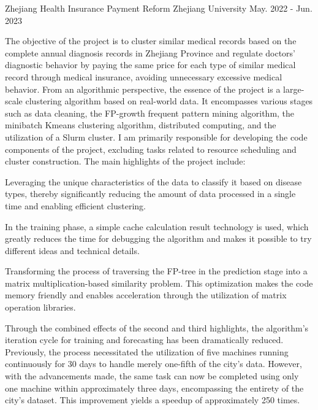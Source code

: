 
\begin{cventries}
	\cventry
	{} %
	{Zhejiang Health Insurance Payment Reform} %
	{Zhejiang University} %
	{May. 2022 - Jun. 2023} %
	{
		\quad The objective of the project is to cluster similar medical records based on the complete annual diagnosis records in Zhejiang Province and regulate doctors' diagnostic behavior by paying the same price for each type of similar medical record through medical insurance, avoiding unnecessary excessive medical behavior. \newline
		\quad From an algorithmic perspective, the essence of the project is a large-scale clustering algorithm based on real-world data. It encompasses various stages such as data cleaning, the FP-growth frequent pattern mining algorithm, the minibatch Kmeans clustering algorithm, distributed computing, and the utilization of a Slurm cluster. I am primarily responsible for developing the code components of the project, excluding tasks related to resource scheduling and cluster construction. \newline
		The main highlights of the project include: \newline
		\vspace{3.5mm}
		\begin{cvitems} %
			\item{Leveraging the unique characteristics of the data to classify it based on disease types, thereby significantly reducing the amount of data processed in a single time and enabling efficient clustering.}
			\item{In the training phase, a simple cache calculation result technology is used, which greatly reduces the time for debugging the algorithm and makes it possible to try different ideas and technical details.}
			\item{Transforming the process of traversing the FP-tree in the prediction stage into a matrix multiplication-based similarity problem. This optimization makes the code memory friendly and enables acceleration through the utilization of matrix operation libraries.}
			\item {Through the combined effects of the second and third highlights, the algorithm's iteration cycle for training and forecasting has been dramatically reduced. Previously, the process necessitated the utilization of five machines running continuously for 30 days to handle merely one-fifth of the city's data. However, with the advancements made, the same task can now be completed using only one machine within approximately three days, encompassing the entirety of the city's dataset. This improvement yields a speedup of approximately 250 times.}
		\end{cvitems}
	}


\end{cventries}

